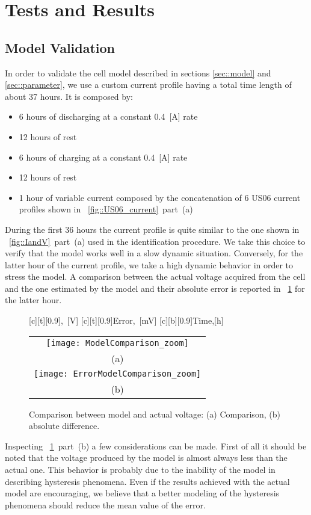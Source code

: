 \documentclass[journal]{IEEEtran}
\begin{document}
\section{Tests and Results}
\label{sec::results} 
\subsection{Model Validation}
In order to validate the cell model described in sections \ref{sec::model} and \ref{sec::parameter}, we use a custom current profile having a total time length of about 37 hours. It is composed by:
\begin{itemize}
\item 6 hours of discharging at a constant 0.4~[A] rate
\item 12 hours of rest
\item 6 hours of charging at a constant 0.4~[A] rate
\item 12 hours of rest
\item 1 hour of variable current composed by the concatenation of 6 US06 current profiles shown in \figurename~\ref{fig::US06_current}~part~(a)
\end{itemize}
During the first 36 hours the current profile is quite similar to the one shown in \figurename~\ref{fig::IandV}~part~(a) used in the identification procedure. We take this choice to verify that the model works well in a slow dynamic situation. Conversely, for the latter hour of the current profile, we take a high dynamic behavior in order to stress the model.
A comparison between the actual voltage acquired from the cell and the one estimated by the model and their absolute error is reported in \figurename~\ref{fig::voltage_comparison} for the latter hour.
\begin{figure}[htbph]
\centering
    [c][t][0.9]{\scriptsize{,~[V]}}
    [c][t][0.9]{\scriptsize{Error,~[mV]}}
    [c][b][0.9]{\scriptsize{Time,[h]}}
\begin{tabular}{c}
\texttt{[image: ModelComparison\_zoom]} \\ 
(a)\\
\texttt{[image: ErrorModelComparison\_zoom]} \\
(b)\\
\end{tabular}
\caption{Comparison between model and actual voltage: (a) Comparison, (b) absolute difference.}
\label{fig::voltage_comparison}    
\end{figure}
Inspecting \figurename~\ref{fig::voltage_comparison}~part~(b) a few considerations can be made. 
First of all it should be noted that the voltage produced by the model is almost always less than the actual one. This behavior is probably due to the inability of the model in describing hysteresis phenomena. Even if the results achieved with the actual model are encouraging, we believe that a better modeling of the hysteresis phenomena should reduce the mean value of the error. 
\end{document}
